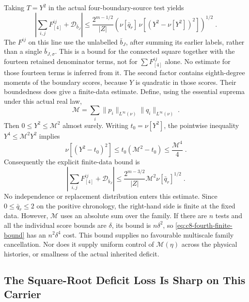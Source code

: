\documentclass[11pt]{article}
\begin{document}
Taking $T=Y^2$ in the actual four-boundary-source test yields
\begin{equation}\label{eq:c8-fourth-deficit-replay}
    \left|\sum_{i,j}F^{ij}_{[4]}+\mathcal D_{\bar b_J}\right|
        \leq\frac{2^{m-1/2}}{|Z|}
            \left(\nu[\bar q_r]\,
                \nu[(Y^2-\nu[Y^2])^2]\right)^{1/2}\;.
\end{equation}
The $F^{ij}$ on this line use the unlabelled $\bar b_J$, after summing
its earlier labels, rather than a single $\bar b_{J,\sigma}$. This is
a bound for the connected square together with the fourteen retained
denominator terms, not for $\sum F^{ij}_{[4]}$ alone. No estimate for
those fourteen terms is inferred from it. The second factor contains
eighth-degree moments of the boundary scores, because $Y$ is quadratic
in those scores. Their boundedness does give a finite-data estimate.
Define, using the essential suprema under this actual real law,
\begin{equation}\label{eq:c8-fourth-score-size}
    \mathcal M=\sum_i\|p_i\|_{L^\infty(\nu)}
                          \|q_i\|_{L^\infty(\nu)}\;.
\end{equation}
Then $0\leq Y^2\leq\mathcal M^2$ almost surely. Writing
$t_0=\nu[Y^2]$, the pointwise inequality $Y^4\leq\mathcal M^2Y^2$
implies
\begin{equation}\label{eq:c8-fourth-score-variance}
    \nu[(Y^2-t_0)^2]\leq
        t_0(\mathcal M^2-t_0)\leq\frac{\mathcal M^4}{4}\;.
\end{equation}
Consequently the explicit finite-data bound is
\begin{equation}\label{eq:c8-fourth-finite-bound}
    \left|\sum_{i,j}F^{ij}_{[4]}+\mathcal D_{\bar b_J}\right|
        \leq\frac{2^{m-3/2}}{|Z|}\mathcal M^2
            \nu[\bar q_r]^{1/2}\;.
\end{equation}
No independence or replacement distribution enters this estimate.
Since $0\leq\bar q_r\leq2$ on the positive chronology, the right-hand
side is finite at the fixed data. However, $\mathcal M$ uses an
absolute sum over the family. If there are $n$ tests and all the
individual score bounds are $\delta$, its bound is $n\delta^2$,
so \eqref{eq:c8-fourth-finite-bound} has an $n^2\delta^4$ cost.
This bound supplies no favourable multiscale family cancellation.
Nor does it supply uniform control of $\mathcal M(\eta)$ across the
physical histories, or smallness of the actual inherited deficit.

\subsection{The Square-Root Deficit Loss Is Sharp on This Carrier}
\end{document}
